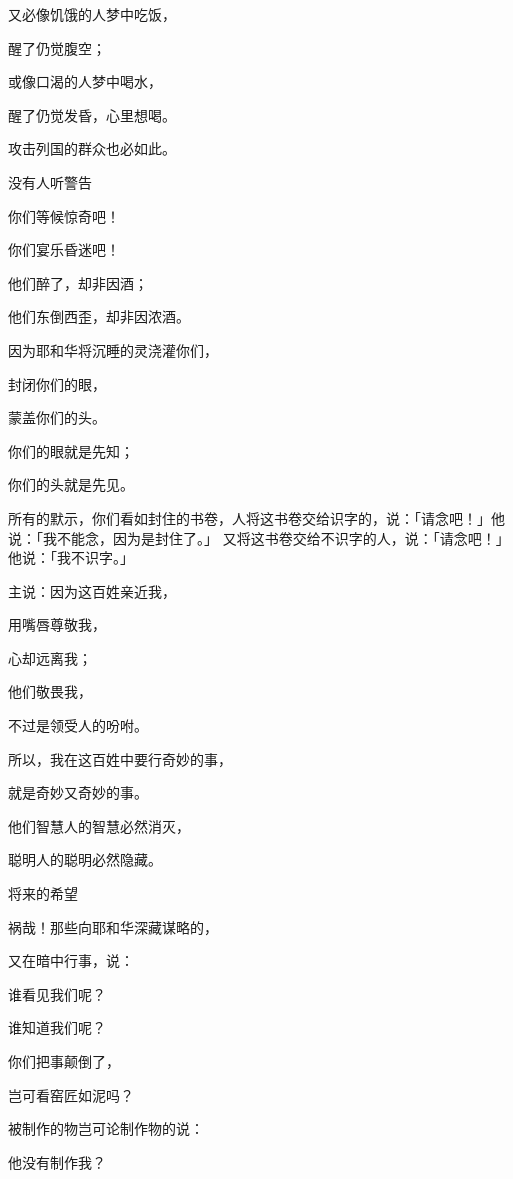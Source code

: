 {\par }{\Q {}又必像饥饿的人梦中吃饭，
\par }{\Q 醒了仍觉腹空；
\par }{\Q 或像口渴的人梦中喝水，
\par }{\Q 醒了仍觉发昏，心里想喝。
\par }{\Q 攻击{}列国的群众也必如此。
\par }{\SH 没有人听警告
\par }{\Q {}你们等候惊奇吧！
\par }{\Q 你们宴乐昏迷吧！
\par }{\Q 他们醉了，却非因酒；
\par }{\Q 他们东倒西歪，却非因浓酒。
\par }{\Q {}因为耶和华将沉睡的灵浇灌你们，
\par }{\Q 封闭你们的眼，
\par }{\Q 蒙盖你们的头。
\par }{\Q 你们的眼就是先知；
\par }{\Q 你们的头就是先见。
\par }{\PP {}所有的默示，你们看如封住的书卷，人将这书卷交给识字的，说：「请念吧！」他说：「我不能念，因为是封住了。」
又将这书卷交给不识字的人，说：「请念吧！」他说：「我不识字。」
\par }{\Q {}主说：因为这百姓亲近我，
\par }{\Q 用嘴唇尊敬我，
\par }{\Q 心却远离我；
\par }{\Q 他们敬畏我，
\par }{\Q 不过是领受人的吩咐。
\par }{\Q {}所以，我在这百姓中要行奇妙的事，
\par }{\Q 就是奇妙又奇妙的事。
\par }{\Q 他们智慧人的智慧必然消灭，
\par }{\Q 聪明人的聪明必然隐藏。
\par }{\SH 将来的希望
\par }{\Q {}祸哉！那些向耶和华深藏谋略的，
\par }{\Q 又在暗中行事，说：
\par }{\Q 谁看见我们呢？
\par }{\Q 谁知道我们呢？
\par }{\Q {}你们把事颠倒了，
\par }{\Q 岂可看窑匠如泥吗？
\par }{\Q 被制作的物岂可论制作物的说：
\par }{\Q 他没有制作我？
}
